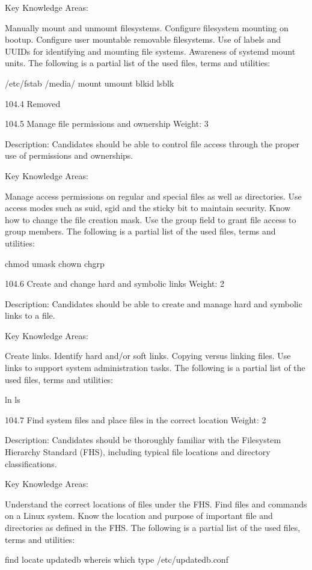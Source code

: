 Key Knowledge Areas:

Manually mount and unmount filesystems.
Configure filesystem mounting on bootup.
Configure user mountable removable filesystems.
Use of labels and UUIDs for identifying and mounting file systems.
Awareness of systemd mount units.
The following is a partial list of the used files, terms and utilities:

/etc/fstab
/media/
mount
umount
blkid
lsblk
 

104.4 Removed
 

104.5 Manage file permissions and ownership
Weight: 3

Description: Candidates should be able to control file access through the proper use of permissions and ownerships.

Key Knowledge Areas:

Manage access permissions on regular and special files as well as directories.
Use access modes such as suid, sgid and the sticky bit to maintain security.
Know how to change the file creation mask.
Use the group field to grant file access to group members.
The following is a partial list of the used files, terms and utilities:

chmod
umask
chown
chgrp
 

104.6 Create and change hard and symbolic links
Weight: 2

Description: Candidates should be able to create and manage hard and symbolic links to a file.

Key Knowledge Areas:

Create links.
Identify hard and/or soft links.
Copying versus linking files.
Use links to support system administration tasks.
The following is a partial list of the used files, terms and utilities:

ln
ls
 

104.7 Find system files and place files in the correct location
Weight: 2

Description: Candidates should be thoroughly familiar with the Filesystem Hierarchy Standard (FHS), including typical file locations and directory classifications.

Key Knowledge Areas:

Understand the correct locations of files under the FHS.
Find files and commands on a Linux system.
Know the location and purpose of important file and directories as defined in the FHS.
The following is a partial list of the used files, terms and utilities:

find
locate
updatedb
whereis
which
type
/etc/updatedb.conf
